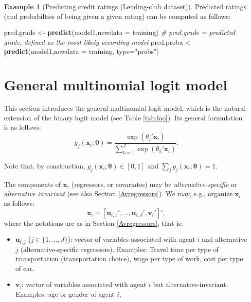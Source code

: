 \documentclass[
  12pt,
]{book}
\newenvironment{Shaded}{\begin{snugshade}}{\end{snugshade}}
\newcommand{\AttributeTok}[1]{\textcolor[rgb]{0.13,0.29,0.53}{#1}}
\newcommand{\CommentTok}[1]{\textcolor[rgb]{0.56,0.35,0.01}{\textit{#1}}}
\newcommand{\FunctionTok}[1]{\textcolor[rgb]{0.13,0.29,0.53}{\textbf{#1}}}
\newcommand{\NormalTok}[1]{#1}
\newcommand{\OtherTok}[1]{\textcolor[rgb]{0.56,0.35,0.01}{#1}}
\newcommand{\StringTok}[1]{\textcolor[rgb]{0.31,0.60,0.02}{#1}}
\providecommand{\tightlist}{%
  \setlength{\itemsep}{0pt}\setlength{\parskip}{0pt}}
\theoremstyle{definition}
\theoremstyle{definition}
\newtheorem{example}{Example}[chapter]
\theoremstyle{definition}
\theoremstyle{definition}
\theoremstyle{remark}
\begin{document}
\begin{example}[Predicting credit ratings (Lending-club dataset)]
Predicted ratings (and probabilties of being given a given rating) can be computed as follows:

\begin{Shaded}
\begin{Highlighting}[]
\NormalTok{pred.grade }\OtherTok{\textless{}{-}} \FunctionTok{predict}\NormalTok{(model1,}\AttributeTok{newdata =}\NormalTok{ training)}
\CommentTok{\# pred.grade = predicted grade, defined as the most likely according model}
\NormalTok{pred.proba }\OtherTok{\textless{}{-}} \FunctionTok{predict}\NormalTok{(model1,}\AttributeTok{newdata =}\NormalTok{ training, }\AttributeTok{type=}\StringTok{"probs"}\NormalTok{)}
\end{Highlighting}
\end{Shaded}

\end{example}

\hypertarget{MNL}{%
\section{General multinomial logit model}\label{MNL}}

This section introduces the general multinomial logit model, which is the natural extension of the binary logit model (see Table \ref{tab:foo}). Its general formulation is as follows:
\begin{equation}
g_j(\mathbf{x}_i;\boldsymbol\theta) = \frac{\exp(\theta_j'\mathbf{x}_i)}{\sum_{k=1}^J \exp(\theta_k'\mathbf{x}_i)}.\label{eq:GeneralMNL}
\end{equation}

Note that, by construction, \(g_j(\mathbf{x}_i;\boldsymbol\theta) \in [0,1]\) and \(\sum_{j}g_j(\mathbf{x}_i;\boldsymbol\theta)=1\).

The components of \(\mathbf{x}_i\) (regressors, or covariates) may be \emph{alternative-specific} or \emph{alternative invariant} (see also Section \ref{Avregressors}). We may, e.g., organize \(\mathbf{x}_i\) as follows:
\begin{equation}
\mathbf{x}_i = [\mathbf{u}_{i,1}',\dots,\mathbf{u}_{i,J}',\mathbf{v}_{i}']',\label{eq:xorganiz}
\end{equation}
where the notations are as in Section \ref{Avregressors}, that is:

\begin{itemize}
\tightlist
\item
  \(\mathbf{u}_{i,j}\) (\(j \in \{1,\dots,J\}\)): vector of variables associated with agent \(i\) and alternative \(j\) (alternative-specific regressors). Examples: Travel time per type of transportation (transportation choice), wage per type of work, cost per type of car.
\item
  \(\mathbf{v}_{i}\): vector of variables associated with agent \(i\) but alternative-invariant. Examples: age or gender of agent \(i\),
\end{itemize}
\end{document}

